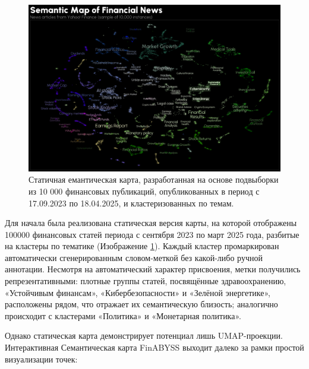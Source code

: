 \begin{figure}[H]
    \centering
    \includegraphics[width=1\linewidth]{img/semantic_map.png}
    \caption{Статичная емантическая карта, разработанная на основе подвыборки из 10 000 финансовых публикаций,
    опубликованных в период с 17.09.2023 по 18.04.2025, и кластеризованных по темам.}
    \label{fig:semantic_map}
\end{figure}

Для начала была реализована статическая версия карты, на которой отображены 100000 финансовых статей периода
с сентября 2023 по март 2025 года, разбитые на кластеры по тематике (Изображение \ref{fig:semantic_map}).
Каждый кластер промаркирован автоматически сгенерированным словом-меткой без какой-либо ручной аннотации.
Несмотря на автоматический характер присвоения, метки получились репрезентативными: плотные группы статей,
посвящённые здравоохранению, «Устойчивым финансам», «Кибербезопасности» и «Зелёной энергетике», расположены
рядом, что отражает их семантическую близость; аналогично происходит с кластерами «Политика» и «Монетарная политика».

Однако статическая карта демонстрирует потенциал лишь UMAP-проекции. Интерактивная Семантическая
карта FinABYSS выходит далеко за рамки простой визуализации точек:

